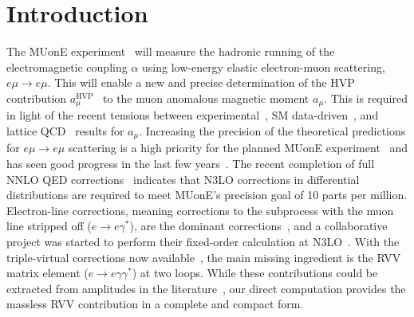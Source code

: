 \documentclass[main.tex]{subfiles}
\begin{document}
\section{Introduction}
The MUonE experiment~\cite{Abbiendi:2016xup,Abbiendi:2022oks,Spedicato:2022qtw,Pilato:2022wvg} will measure the hadronic running of the electromagnetic coupling $\alpha$ using low-energy elastic electron-muon scattering, $e\mu \to e\mu$.
This will enable a new and precise determination of the \ac{HVP} contribution $a_{\mu}^{\text{HVP}}$~\cite{CarloniCalame:2015obs,Balzani:2021del} to the muon anomalous magnetic moment $a_{\mu}$. This is required in light of the recent tensions between experimental~\cite{Muong-2:2021ojo}, \ac{SM} data-driven~\cite{Aoyama:2020ynm}, and lattice \ac{QCD}~\cite{Borsanyi:2020mff} results for $a_\mu$.
Increasing the precision of the theoretical predictions for $e\mu \to e\mu$ scattering is a high priority for the planned MUonE experiment~\cite{Banerjee:2020tdt,Budassi:2022dco} and has seen good progress in the last few years~\cite{Alacevich:2018vez,Budassi:2021twh,Fael:2019nsf,Fael:2018dmz,CarloniCalame:2020yoz}.
The recent completion of full \ac{NNLO} \ac{QED} corrections~\cite{Broggio:2022htr} indicates that 
\ac{N3LO} corrections in differential distributions are required to meet MUonE's precision goal of 10 parts per million.
Electron-line corrections, meaning corrections to the subprocess with the muon line stripped off ($e\to e \gamma^*$), are the dominant corrections~\cite{Broggio:2022htr}, and a collaborative project was started to perform their fixed-order calculation at \ac{N3LO}~\cite{Durham:n3lo}.
With the triple-virtual corrections now available~\cite{Fael:2022rgm,Fael:2022miw,Fael:2023zqr}, the main missing ingredient is the \ac{RVV} matrix element ($e\to e \gamma \gamma^*$) at two loops.
While these contributions could be extracted from amplitudes in the literature~\cite{Garland:2001tf,Garland:2002ak,Gehrmann:2011ab}, our direct computation provides the massless \ac{RVV} contribution in a complete and compact form.
\end{document}
